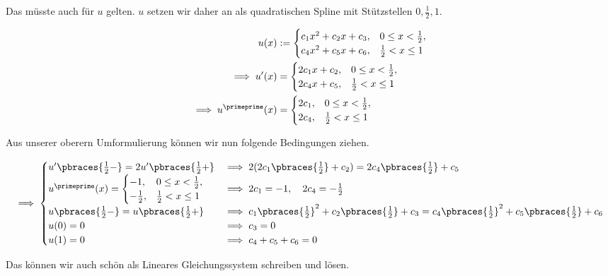 \begin{solution}
Das müsste auch für $u$ gelten.
$u$ setzen wir daher an als quadratischen Spline mit Stützstellen $0, \frac{1}{2}, 1$.

\begin{align*}
  u(x)
  & :=
  \begin{cases}
    c_1 x^2 + c_2 x + c_3, & 0 \leq x < \frac{1}{2}, \\
    c_4 x^2 + c_5 x + c_6, & \frac{1}{2} < x \leq 1
  \end{cases} \\
  \implies
  u^\prime(x)
  & =
  \begin{cases}
    2 c_1 x + c_2, & 0 \leq x < \frac{1}{2}, \\
    2 c_4 x + c_5, & \frac{1}{2} < x \leq 1
  \end{cases} \\
  \implies
  u^\primeprime(x)
  & =
  \begin{cases}
    2 c_1, & 0 \leq x < \frac{1}{2}, \\
    2 c_4, & \frac{1}{2} < x \leq 1
  \end{cases}
\end{align*}

Aus unserer oberern Umformulierung können wir nun folgende Bedingungen ziehen.

\begin{align*}
  \implies
  \begin{cases}
    u^\prime \pbraces{\frac{1}{2} -} = 2 u^\prime \pbraces{\frac{1}{2} +}
    & \implies 2 (2 c_1 \pbraces{\frac{1}{2}} + c_2) = 2 c_4 \pbraces{\frac{1}{2}} + c_5 \\
    u^\primeprime(x)
    =
    \begin{cases}
      -1,           & 0 \leq x < \frac{1}{2}, \\
      -\frac{1}{2}, & \frac{1}{2} < x \leq 1
    \end{cases}
    & \implies 2 c_1 = -1, \quad 2 c_4 = -\frac{1}{2} \\
    u\pbraces{\frac{1}{2} -} = u\pbraces{\frac{1}{2} +}
    & \implies c_1 \pbraces{\frac{1}{2}}^2 + c_2 \pbraces{\frac{1}{2}} + c_3 = c_4 \pbraces{\frac{1}{2}}^2 + c_5 \pbraces{\frac{1}{2}} + c_6 \\
    u(0) = 0
    & \implies c_3 = 0 \\
    u(1) = 0
    & \implies c_4 + c_5 + c_6 = 0
    \end{cases}
\end{align*}

Das können wir auch schön als Lineares Gleichungssystem schreiben und lösen.


\end{solution}
